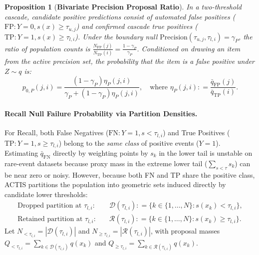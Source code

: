 \documentclass[11pt,a4paper]{article}
\newcommand{\coloneqq}{\mathrel{\mathop:}=}
\newtheorem{proposition}[theorem]{Proposition}
\begin{document}
\begin{proposition}[\textbf{Bivariate Precision Proposal Ratio}]\label{prop:precision_proposal_p0}
In a two-threshold cascade, candidate positive predictions consist of automated false positives ($\text{FP}: Y=0, s(x) \ge \tau_{u, j}$) and confirmed cascade true positives ($\text{TP}: Y=1, s(x) \ge \tau_{l, i}$). Under the boundary null $\text{Precision}(\tau_{u, j}, \tau_{l, i}) = \gamma_P$, the ratio of population counts is $\frac{N_{\text{FP}}(j)}{N_{\text{TP}}(i)} = \frac{1 - \gamma_P}{\gamma_P}$. 
Conditioned on drawing an item from the active precision set, the probability that the item is a false positive under $Z \sim q$ is:
\begin{equation}\label{eq:p0_precision_formula}
p_{0, P}(j, i) = \frac{(1 - \gamma_P)\eta_P(j, i)}{\gamma_P + (1 - \gamma_P)\eta_P(j, i)}, \quad \text{where } \eta_P(j, i) \coloneqq \frac{\bar{q}_{\text{FP}}(j)}{\bar{q}_{\text{TP}}(i)}.
\end{equation}
\end{proposition}

\paragraph{Recall Null Failure Probability via Partition Densities.}
For Recall, both False Negatives ($\text{FN}: Y=1, s < \tau_{l, i}$) and True Positives ($\text{TP}: Y=1, s \ge \tau_{l, i}$) belong to the \emph{same class} of positive events ($Y=1$).
Estimating $\bar{q}_{\text{FN}}$ directly by weighting points by $s_k$ in the lower tail is unstable on rare-event datasets because proxy mass in the extreme lower tail ($\sum_{s < \tau} s_k$) can be near zero or noisy.
However, because both FN and TP share the positive class, ACTIS partitions the population into geometric sets induced directly by candidate lower thresholds:
\begin{align}
\text{Dropped partition at } \tau_{l, i}: \quad & \mathcal{D}(\tau_{l, i}) \coloneqq \{k \in \{1, \dots, N\} : s(x_k) < \tau_{l, i}\}, \\
\text{Retained partition at } \tau_{l, i}: \quad & \mathcal{R}(\tau_{l, i}) \coloneqq \{k \in \{1, \dots, N\} : s(x_k) \ge \tau_{l, i}\}.
\end{align}
Let $N_{< \tau_{l, i}} = |\mathcal{D}(\tau_{l, i})|$ and $N_{\ge \tau_{l, i}} = |\mathcal{R}(\tau_{l, i})|$, with proposal masses $Q_{< \tau_{l, i}} = \sum_{k \in \mathcal{D}(\tau_{l, i})} q(x_k)$ and $Q_{\ge \tau_{l, i}} = \sum_{k \in \mathcal{R}(\tau_{l, i})} q(x_k)$.
\end{document}
